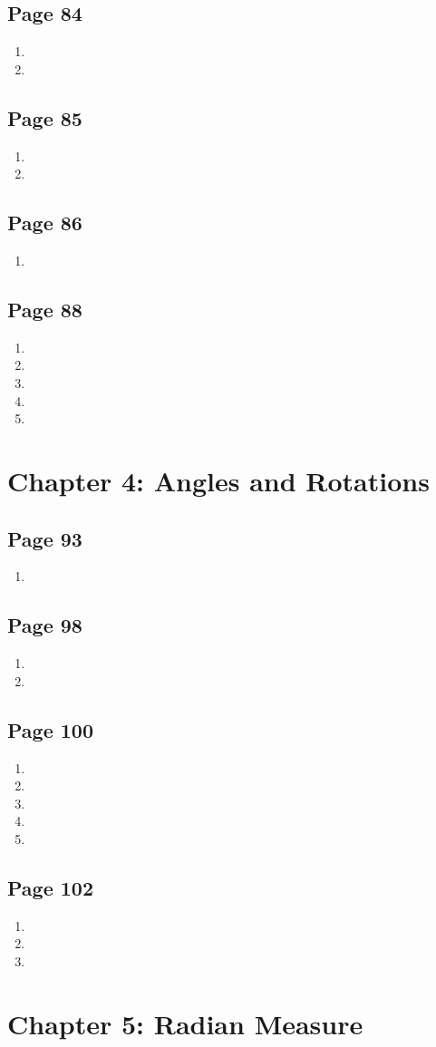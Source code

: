 \documentclass{article}
\newenvironment{solutions}[1]
{\subsection*{#1}
 \begin{enumerate}[leftmargin=1.5em]}
{\end{enumerate}}
\newcommand{\solution}{\item}
\begin{document}
\begin{solutions}{Page 84}
\solution
\solution
\end{solutions}

\begin{solutions}{Page 85}
\solution
\solution
\end{solutions}

\begin{solutions}{Page 86}
\solution
\end{solutions}

\begin{solutions}{Page 88}
\solution
\solution
\solution
\solution
\solution
\end{solutions}


\section*{Chapter 4: Angles and Rotations}

\begin{solutions}{Page 93}
\solution
\end{solutions}

\begin{solutions}{Page 98}
\solution
\solution
\end{solutions}

\begin{solutions}{Page 100}
\solution
\solution
\solution
\solution
\solution
\end{solutions}

\begin{solutions}{Page 102}
\solution
\solution
\solution
\end{solutions}


\section*{Chapter 5: Radian Measure}
\end{document}
